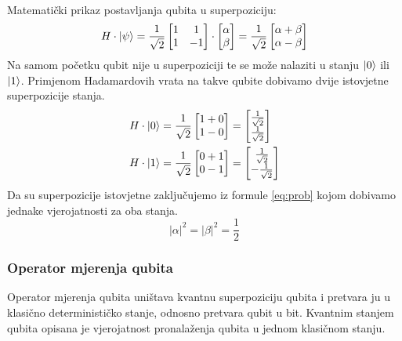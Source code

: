 \documentclass[times, utf8, zavrsni, numeric]{fer}
\begin{document}
\paragraph{}
Matematički prikaz postavljanja qubita u superpoziciju:
\begin{equation}
H\cdot \ket{\psi} = \frac{1}{\sqrt{2}}
\begin{bmatrix}
1 & 1 \\ 1 & -1
\end{bmatrix} \cdot
\begin{bmatrix}
\alpha \\ \beta
\end{bmatrix}
 = \frac{1}{\sqrt{2}}
\begin{bmatrix}
\alpha + \beta \\ \alpha - \beta
\end{bmatrix}
\end{equation}
Na samom početku qubit nije u superpoziciji te se može nalaziti u stanju $\ket{0}$ ili $\ket{1}$. Primjenom Hadamardovih vrata na takve qubite dobivamo dvije istovjetne superpozicije stanja.
\begin{align}
\begin{split}
H \cdot \ket{0} &= \frac{1}{\sqrt{2}}
\begin{bmatrix}
1 + 0 \\ 1 - 0
\end{bmatrix}
= \begin{bmatrix}
\frac{1}{\sqrt{2}} \\ \frac{1}{\sqrt{2}}
\end{bmatrix}
\\
H \cdot \ket{1} &= \frac{1}{\sqrt{2}}
\begin{bmatrix}
0 + 1 \\ 0 - 1
\end{bmatrix}
= \begin{bmatrix}
\frac{1}{\sqrt{2}} \\ -\frac{1}{\sqrt{2}}
\end{bmatrix}
\end{split}
\end{align}
Da su superpozicije istovjetne zaključujemo iz formule \ref{eq:prob} kojom dobivamo jednake vjerojatnosti za oba stanja.
\begin{equation}
|\alpha|^2 = |\beta|^2 = \frac{1}{2}
\end{equation}

\subsubsection{Operator mjerenja qubita}
Operator mjerenja qubita uništava kvantnu superpoziciju qubita i pretvara ju u klasično determinističko stanje, odnosno pretvara qubit u bit. Kvantnim stanjem qubita opisana je vjerojatnost pronalaženja qubita u jednom klasičnom stanju.
\end{document}
